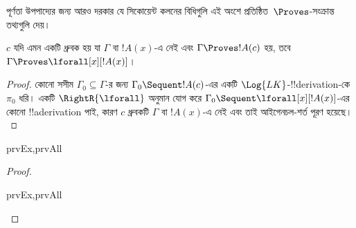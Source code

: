 \documentclass[../../../include/open-logic-section]{subfiles}
\begin{document}

\begin{explain}
  পূর্ণতা উপপাদ্যের জন্য আরও দরকার যে সিকোয়েন্ট কলনের বিধিগুলি
  এই অংশে প্রতিষ্ঠিত~$\Proves$-সংক্রান্ত তথ্যগুলি দেয়।
\end{explain}

\begin{thm}
 $c$ যদি এমন একটি ধ্রুবক হয় যা
$\Gamma$ বা $!A(x)$-এ নেই এবং $\Gamma \Proves !A(c)$ হয়, তবে
$\Gamma \Proves \lforall[x][!A(x)]$।
\end{thm}

\begin{proof}
কোনো সসীম $\Gamma_0 \subseteq \Gamma$-র জন্য $\Gamma_0 \Sequent !A(c)$-এর
একটি $\Log{LK}$-!!{derivation}-কে~$\pi_0$ ধরি। একটি
$\RightR{\lforall}$ অনুমান যোগ করে $\Gamma_0 \Sequent
\lforall[x][!A(x)]$-এর কোনো !!a{derivation} পাই, কারণ $c$ ধ্রুবকটি
$\Gamma$ বা $!A(x)$-এ নেই এবং তাই আইগেনচল-শর্ত পূরণ হয়েছে।
\end{proof}

\begin{prop}
\begin{tagenumerate}{prvEx,prvAll}
\end{tagenumerate}
\end{prop}

\begin{proof}
\begin{tagenumerate}{prvEx,prvAll}
\end{tagenumerate}
\end{proof}
\end{document}
